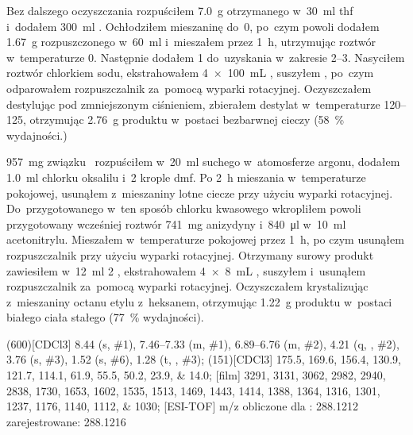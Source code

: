 Bez dalszego oczyszczania rozpuściłem \SI{7.0}{\gram} otrzymanego 
  w~\SI{30}{\ml} \gls{thf} i~dodałem \SI{300}{\ml} .
Ochłodziłem mieszaninę do~\SI{0}{\degC}, po~czym powoli dodałem \SI{1.67}{\gram} 
  rozpuszczonego w~\SI{60}{\ml}  i~mieszałem przez \SI{1}{\hour},
  utrzymując roztwór w~temperaturze \SI{0}{\degC}.
Następnie dodałem \SI{1}{\Molar}  do~uzyskania \pH w~zakresie \numrange{2}{3}.
Nasyciłem roztwór chlorkiem sodu, ekstrahowałem \SI[product-units = single]{4 x 100}{\mL} ,
  suszyłem , po~czym odparowałem rozpuszczalnik za~pomocą wyparki rotacyjnej.
Oczyszczałem destylując pod zmniejszonym ciśnieniem, zbierałem destylat w~temperaturze
  \SIrange{120}{125}{\degC}, otrzymując \SI{2.76}{\gram} produktu w~postaci bezbarwnej cieczy
  (\SI{58}{\percent} wydajności.)

\SI{957}{\mg} związku~ rozpuściłem w~\SI{20}{\ml}
  suchego  w~atomosferze argonu, dodałem \SI{1.0}{\ml} chlorku oksalilu
  i~\num{2} krople \gls{dmf}.
Po \SI{2}{\hour} mieszania w~temperaturze pokojowej, usunąłem z~mieszaniny lotne ciecze
  przy użyciu wyparki rotacyjnej.
Do~przygotowanego w~ten sposób chlorku kwasowego wkropliłem powoli przygotowany wcześniej roztwór
  \SI{741}{\mg} anizydyny i~\SI{840}{\ul}  w~\SI{10}{\ml} acetonitrylu.
Mieszałem w~temperaturze pokojowej przez \SI{1}{\hour}, po czym usunąłem rozpuszczalnik
  przy użyciu wyparki rotacyjnej.
Otrzymany surowy produkt zawiesiłem w~\SI{12}{\ml} \SI{2}{\Molar} ,
  ekstrahowałem \SI[product-units = single]{4 x 8}{\mL} , suszyłem 
  i~usunąłem rozpuszczalnik za~pomocą wyparki rotacyjnej.
Oczyszczałem krystalizując z~mieszaniny octanu etylu z~heksanem, otrzymując \SI{1.22}{\gram}
  produktu w~postaci białego ciała stałego (\SI{77}{\percent} wydajności).

\begin{fullexp}
  \NMR(600)[CDCl3] \num{8.44} (s, \#{1}), \numrange{7.46}{7.33} (m, \#{1}), \numrange{6.89}{6.76} (m, \#{2}), \num{4.21} (q, , \#{2}), \num{3.76} (s, \#{3}), \num{1.52} (s, \#{6}), \num{1.28} (t, , \#{3});
  (151)[CDCl3] \numlist{175.5; 169.6; 156.4; 130.9; 121.7; 114.1; 61.9; 55.5; 50.2; 23.9; 14.0};
  [film] \numlist{3291; 3131; 3062; 2982; 2940; 2838; 1730; 1653; 1602; 1535; 1513; 1469; 1443; 1414; 1388; 1364; 1316; 1301; 1237; 1176; 1140; 1112; 1030};
  [ESI-TOF] m/z obliczone dla : \num{288.1212} zarejestrowane: \num{288.1216}
\end{fullexp}
  
